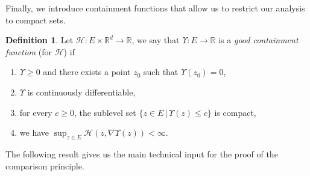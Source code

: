 \documentclass[a4paper]{article}
\newcommand{\cH}{\mathcal{H}}
\newcommand{\bR}{\mathbb{R}}
\numberwithin{equation}{section}
\theoremstyle{definition}
\newtheorem{definition}[theorem]{Definition}
\begin{document}
Finally, we introduce containment functions that allow us to restrict our analysis to compact sets.


\begin{definition} \label{definition:good_containment_function}
	Let $\cH : E \times \bR^d \rightarrow \bR$, we say that $\Upsilon : E \rightarrow \bR$ is a \textit{good containment function} (for $\cH$) if
	\begin{enumerate}[($\Upsilon$a)]
		\item $\Upsilon \geq 0$ and there exists a point $z_0$ such that $\Upsilon(z_0) = 0$,
		\item $\Upsilon$ is continuously differentiable, 
		\item for every $c \geq 0$, the sublevel set $\{z \in E \, | \, \Upsilon(z) \leq c\}$ is compact,
		\item we have $ \sup_{z \in E} \cH(z,\nabla \Upsilon(z)) < \infty$.
	\end{enumerate}
\end{definition}

The following result gives us the main technical input for the proof of the comparison principle.
\end{document}
